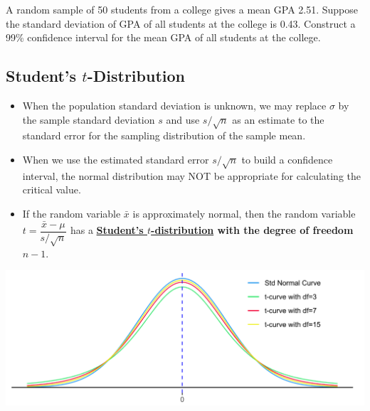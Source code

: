 \begin{example}

A random sample of 50 students from a college gives a mean GPA 2.51.
Suppose the standard deviation of GPA of all students at the college is
0.43. Construct a 99\% confidence interval for the mean GPA of all
students at the college.

\end{example}
\vspace*{6\baselineskip}


\hypertarget{students-t-distribution}{%
\subsection{\texorpdfstring{Student's
\(t\)-Distribution}{Student's t-Distribution}}\label{students-t-distribution}}

\begin{itemize}
\item
  When the population standard deviation is unknown, we may replace
  \(\sigma\) by the sample standard deviation \(s\) and use
  \(s/\sqrt{n}\) as an estimate to the standard error for the sampling
  distribution of the sample mean.
\item
  When we use the estimated standard error \(s / \sqrt{n}\) to build a
  confidence interval, the normal distribution may NOT be
  appropriate for calculating the critical value.
\item
  If the random variable \(\bar{x}\) is approximately normal, then the
  random variable \(t=\dfrac{\bar{x}-\mu}{s / \sqrt{n}}\) has a
  \textbf{\href{https://en.wikipedia.org/wiki/Student\%27s_t-distribution}{Student's
  \(t\)-distribution} with the degree of freedom \(n-1\)}.
\end{itemize}

\includegraphics[width=\textwidth]{Figures/t-curves}

